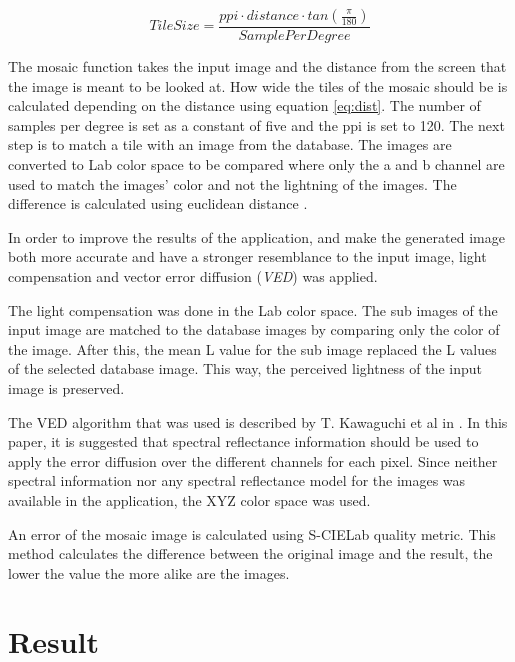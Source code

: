 \documentclass[conference]{IEEEtran}
\begin{document}
\begin{equation}
  TileSize = \frac{ppi \cdot distance \cdot tan(\frac{\pi}{180})}{SamplePerDegree}
  \label{eq:dist}
\end{equation}

The mosaic function takes the input image and the distance from the screen that the image is meant to be looked at. How wide the tiles of the mosaic should be is calculated depending on the distance using equation \ref{eq:dist}. The number of samples per degree is set as a constant of five and the ppi is set to 120. The next step is to match a tile with an image from the database. The images are converted to Lab color space to be compared where only the a and b channel are used to match the images’ color and not the lightning of the images. The difference is calculated using euclidean distance \cite{deza2009encyclopedia}.

In order to improve the results of the application, and make the generated image both more accurate and have a stronger resemblance to the input image, light compensation and vector error diffusion (\emph{VED}) was applied.

The light compensation was done in the Lab color space. The sub images of the input image are matched to the database images by comparing only the color of the image. After this, the mean L value for the sub image replaced the L values of the selected database image. This way, the perceived lightness of the input image is preserved.

The VED algorithm that was used is described by T. Kawaguchi et al in \cite{kawaguchi1999vector}. In this paper, it is suggested that spectral reflectance information should be used to apply the error diffusion over the different channels for each pixel. Since neither spectral information nor any spectral reflectance model for the images was available in the application, the XYZ color space was used.

An error of the mosaic image is calculated using S-CIELab quality metric. This method calculates the difference between the original image and the result, the lower the value the more alike are the images. \cite{pedersen2009survey}

\section{Result}
\end{document}
